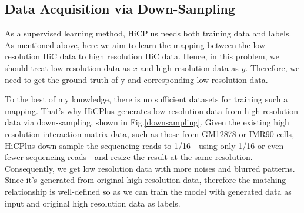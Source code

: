 \documentclass{article}
\begin{document}
\subsection{Data Acquisition via Down-Sampling}

As a supervised learning method, HiCPlus needs both training data and labels. As mentioned above, here we aim to learn the mapping between the low resolution HiC data to high resolution HiC data. Hence, in this problem, we should treat low resolution data as $x$ and high resolution data as $y$. Therefore, we need to get the ground truth of y and corresponding low resolution data.

To the best of my knowledge, there is no sufficient datasets for training such a mapping. That's why HiCPlus generates low resolution data from high resolution data via down-sampling, shown in Fig.\ref{downsampling}. Given the existing high resolution interaction matrix data, such as those from GM12878 or IMR90 cells, HiCPlus down-sample the sequencing reads to 1/16 - using only 1/16 or even fewer sequencing reads - and resize the result at the same resolution. Consequently, we get low resolution data with more noises and blurred patterns. Since it's generated from original high resolution data, therefore the matching relationship is well-defined so as we can train the model with generated data as input and original high resolution data as labels.
\end{document}
